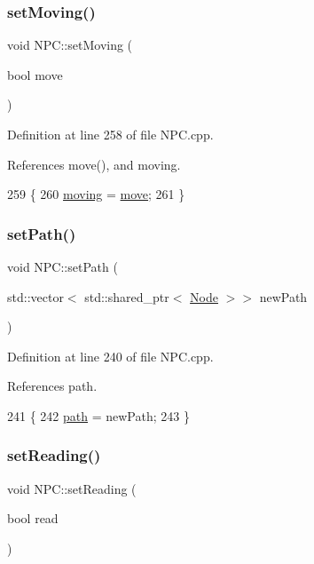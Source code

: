 \subsubsection{\texorpdfstring{set\+Moving()}{setMoving()}}
{\footnotesize\ttfamily void N\+P\+C\+::set\+Moving (\begin{DoxyParamCaption}\item[{bool}]{move }\end{DoxyParamCaption})}



Definition at line 258 of file N\+P\+C.\+cpp.



References move(), and moving.


\begin{DoxyCode}
259 \{
260     \hyperlink{class_n_p_c_a4dfc6a89cae1301e7f722bbba67f3dbb}{moving} = \hyperlink{class_n_p_c_abaa15a4fd5a37a62983d7fd2acafe271}{move};
261 \}
\end{DoxyCode}
\mbox{\label{class_n_p_c_a9582ddb2cc78ad77c8ded77e192be5b0}} 
\subsubsection{\texorpdfstring{set\+Path()}{setPath()}}
{\footnotesize\ttfamily void N\+P\+C\+::set\+Path (\begin{DoxyParamCaption}\item[{std\+::vector$<$ std\+::shared\+\_\+ptr$<$ \hyperlink{class_node}{Node} $>$$>$}]{new\+Path }\end{DoxyParamCaption})}



Definition at line 240 of file N\+P\+C.\+cpp.



References path.


\begin{DoxyCode}
241 \{
242     \hyperlink{class_n_p_c_afdd6b1a6e4827259ec9d9fcd075cb099}{path} = newPath;
243 \}
\end{DoxyCode}
\mbox{\label{class_n_p_c_a9e0ab46138990129c16b78c2a6ee6e25}} 
\subsubsection{\texorpdfstring{set\+Reading()}{setReading()}}
{\footnotesize\ttfamily void N\+P\+C\+::set\+Reading (\begin{DoxyParamCaption}\item[{bool}]{read }\end{DoxyParamCaption})}



